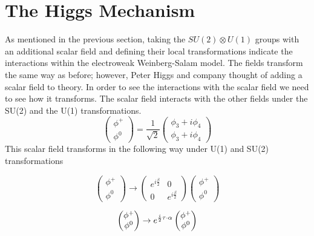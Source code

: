 \section{The Higgs Mechanism}
As mentioned in the previous section, taking the $SU(2)\otimes U(1)$ groups with an additional scalar field and defining their local transformations indicate the interactions within the electroweak Weinberg-Salam model. The fields transform the same way as before; however, Peter Higgs and company thought of adding a scalar field to theory. In order to see the interactions with the scalar field we need to see how it transforms. 
The scalar field interacts with the other fields under the SU(2) and the U(1) transformations.  
\[\begin{pmatrix}\phi^+ \\ \phi^0\end{pmatrix} = \frac{1}{\sqrt{2}}\begin{pmatrix} \phi_3 + i\phi_4 \\ \phi_3 + i\phi_4\end{pmatrix}  \]
This scalar field transforms in the following way under U(1) and SU(2) transformations 

\[\begin{pmatrix}\phi^+ \\ \phi^0\end{pmatrix} \rightarrow \begin{pmatrix} e^{i\frac{\beta}{2}} & 0 \\ 0 & e^{i\frac{\beta}{2}}\end{pmatrix}\begin{pmatrix}\phi^+ \\ \phi^0\end{pmatrix}  \]

\[\begin{pmatrix}\phi^+ \\ \phi^0\end{pmatrix} \rightarrow e^{\frac{i}{2}\bold{\tau}\cdot\bold{\alpha}}    \begin{pmatrix}\phi^+ \\ \phi^0\end{pmatrix}  \]

